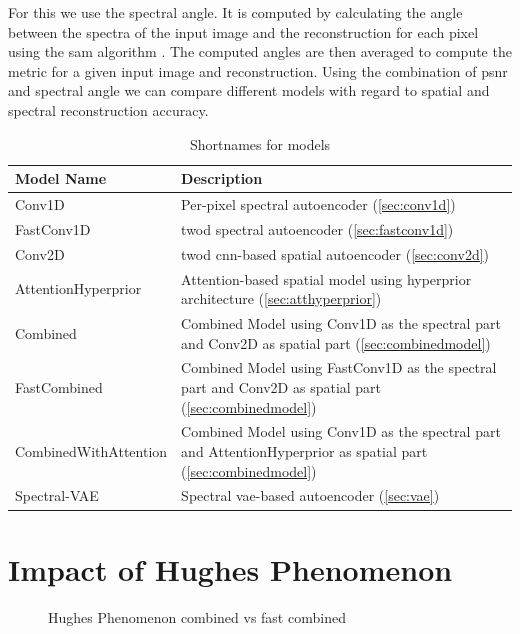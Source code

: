 For this we use the spectral angle. It is computed by calculating the angle between the spectra of the input image and the reconstruction for each pixel using the \ac{sam} algorithm \citep{kruse_spectral_1993}. The computed angles are then averaged to compute the metric for a given input image and reconstruction. Using the combination of \ac{psnr} and spectral angle we can compare different models with regard to spatial and spectral reconstruction accuracy.
\begin{table}
\centering
\begin{tabularx}{\textwidth}{|L|L|}
\hline
Model Name & Description \\
\hline\hline
Conv1D & Per-pixel spectral autoencoder (\autoref{sec:conv1d})\\
\hline
FastConv1D & \Ac{twod} spectral autoencoder (\autoref{sec:fastconv1d})\\
\hline
Conv2D & \Ac{twod} \ac{cnn}-based spatial autoencoder (\autoref{sec:conv2d})\\
\hline
AttentionHyperprior & Attention-based spatial model using hyperprior architecture (\autoref{sec:atthyperprior}) \\
\hline
Combined & Combined Model using Conv1D as the spectral part and Conv2D as spatial part (\autoref{sec:combinedmodel}) \\
\hline
FastCombined & Combined Model using FastConv1D as the spectral part and Conv2D as spatial part (\autoref{sec:combinedmodel}) \\
\hline
CombinedWithAttention & Combined Model using Conv1D as the spectral part and AttentionHyperprior as spatial part (\autoref{sec:combinedmodel}) \\
\hline
Spectral-VAE & Spectral \ac{vae}-based autoencoder (\autoref{sec:vae}) \\
\hline
\end{tabularx}
\caption{Shortnames for models}
\label{fig:shortnames}
\end{table}
\section{Impact of Hughes Phenomenon \label{sec:ch5hughes}}
\begin{figure}[!ht]
    \centering
{}\datatable
{}
\caption{Hughes Phenomenon combined vs fast combined}
\label{fig:hughes}
\end{figure}


